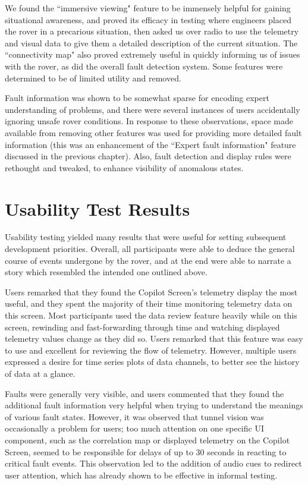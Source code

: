 We found the ``immersive viewing" feature to be immensely helpful for gaining situational awareness, and proved its efficacy in testing where engineers placed the rover in a precarious situation, then asked us over radio to use the telemetry and visual data to give them a detailed description of the current situation. The ``connectivity map" also proved extremely useful in quickly informing us of issues with the rover, as did the overall fault detection system. Some features were determined to be of limited utility and removed.

Fault information was shown to be somewhat sparse for encoding expert understanding of problems, and there were several instances of users accidentally ignoring unsafe rover conditions. In response to these observations, space made available from removing other features was used for providing more detailed fault information (this was an enhancement of the ``Expert fault information" feature discussed in the previous chapter). Also, fault detection and display rules were rethought and tweaked, to enhance visibility of anomalous states.

\section{Usability Test Results}

Usability testing yielded many results that were useful for setting subsequent development priorities. Overall, all participants were able to deduce the general course of events undergone by the rover, and at the end were able to narrate a story which resembled the intended one outlined above.

Users remarked that they found the Copilot Screen's telemetry display the most useful, and they spent the majority of their time monitoring telemetry data on this screen. Most participants used the data review feature heavily while on this screen, rewinding and fast-forwarding through time and watching displayed telemetry values change as they did so. Users remarked that this feature was easy to use and excellent for reviewing the flow of telemetry. However, multiple users expressed a desire for time series plots of data channels, to better see the history of data at a glance.

Faults were generally very visible, and users commented that they found the additional fault information very helpful when trying to understand the meanings of various fault states. However, it was observed that tunnel vision was occasionally a problem for users; too much attention on one specific UI component, such as the correlation map or displayed telemetry on the Copilot Screen, seemed to be responsible for delays of up to 30 seconds in reacting to critical fault events. This observation led to the addition of audio cues to redirect user attention, which has already shown to be effective in informal testing.


